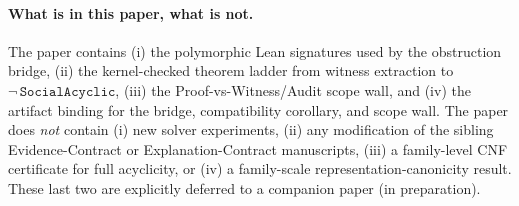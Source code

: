\paragraph{What is in this paper, what is not.}
The paper contains
(i) the polymorphic Lean signatures used by the obstruction bridge,
(ii) the kernel-checked theorem ladder from witness extraction to \(\neg\,\mathtt{SocialAcyclic}\),
(iii) the Proof-vs-Witness/Audit scope wall, and
(iv) the artifact binding for the bridge, compatibility corollary, and scope wall.
The paper does \emph{not} contain
(i) new solver experiments,
(ii) any modification of the sibling Evidence-Contract or Explanation-Contract manuscripts,
(iii) a family-level CNF certificate for full acyclicity, or
(iv) a family-scale representation-canonicity result.
These last two are explicitly deferred to a companion paper (in preparation).
